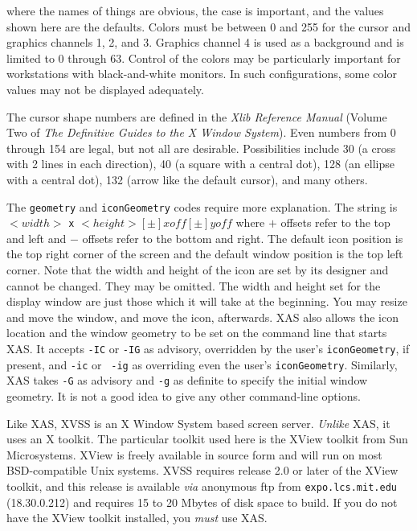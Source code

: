 \noindent where the names of things are obvious, the case is
important, and the values shown here are the defaults.  Colors must be
between 0 and 255 for the cursor and graphics channels 1, 2, and 3.
Graphics channel 4 is used as a background and is limited to 0 through
63.   Control of the colors may be particularly important for
workstations with black-and-white monitors.  In such configurations,
some color values may not be displayed adequately.

The cursor shape numbers are defined in the {\it Xlib Reference
Manual} (Volume Two of {\it The Definitive Guides to the X Window
System}).  Even numbers from 0 through 154 are legal, but not all are
desirable.  Possibilities include 30 (a cross with 2 lines in each
direction), 40 (a square with a central dot), 128 (an ellipse with a
central dot), 132 (arrow like the default cursor), and many others.

The {\tt geometry} and {\tt iconGeometry} codes require more
explanation.  The string is $< width >$ {\tt x} $< height >
[\pm] xoff [\pm] yoff$ where $+$ offsets refer to the top and left and
$-$ offsets refer to the bottom and right.  The default icon position
is the top right corner of the screen and the default window position
is the top left corner.  Note that the width and height of the icon
are set by its designer and cannot be changed.  They may be omitted.
The width and height set for the display window are just those which
it will take at the beginning.  You may resize and move the window,
and move the icon, afterwards.  XAS also allows the icon location and
the window geometry to be set on the command line that starts
\hbox{XAS}.  It accepts {\tt -IC} or {\tt -IG} as advisory, overridden
by the user's {\tt iconGeometry}, if present, and {\tt -ic} or {\tt
-ig} as overriding even the user's {\tt iconGeometry}.  Similarly, XAS
takes {\tt -G} as advisory and {\tt -g} as definite to specify the
initial window geometry.  It is not a good idea to give any other
command-line options.


Like XAS, XVSS is an X Window System based screen server.  {\it Unlike}
XAS, it uses an X toolkit.  The particular toolkit used here is the XView
toolkit from Sun Microsystems.  XView is freely available in source
form and will run on most BSD-compatible Unix systems.  XVSS requires
release 2.0 or later of the XView toolkit, and this release is available
{\it via} anonymous ftp from {\tt expo.lcs.mit.edu} (18.30.0.212) and
requires 15 to 20 Mbytes of disk space to build.  If you do not have
the XView toolkit installed, you {\it must} use \hbox{XAS}.

